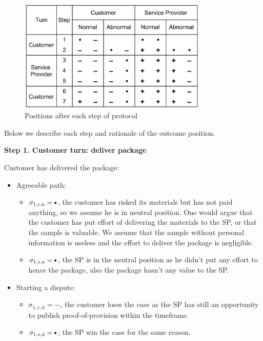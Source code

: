 \documentclass{ieeeaccess}
\newcommand\sbullet[1][.75]{\mathbin{\ThisStyle{\vcenter{\hbox{%
  \scalebox{#1}{$\SavedStyle\bullet$}}}}}%
}
\begin{document}
\begin{figure}[h!]
\includegraphics[width=9cm]{formal-table-of-positions.png}
\centering
\caption{Positions after each step of protocol}
\label{fig:positions}
\end{figure}


Below we describe each step and rationale of the outcome position.


\noindent \textbf
{Step 1. Customer turn: deliver package}\label{step-1-deliver-package}

Customer has delivered the package:

\begin{itemize}
\item
  Agreeable path:

  \begin{itemize}
  
  \item
    \(\sigma_{1, c, \mathrm{n}} = \sbullet\), the customer has risked its
    materials but has not paid anything, so we assume he is in neutral
    position. One would argue that the customer has put effort of
    delivering the materials to the SP, or that the sample is valuable.
    We assume that the sample without personal information is useless
    and the effort to deliver the package is negligible.
  \item
    \(\sigma_{1, s, \mathrm{n}} = \sbullet\), the SP is in the neutral position as he didn't put any effort to hence the package, also the package hasn't any value to the SP.
  \end{itemize}
\item
  Starting a dispute:

  \begin{itemize}
  
  \item
    \(\sigma_{1, c, \mathrm{d}} = -\), the customer loses the case as the SP has still an opportunity to publish proof-of-provision within the timeframe.
  \item
    \(\sigma_{1, s, \mathrm{d}} = \sbullet\), the SP win the case for the same reason.
  \end{itemize}
\end{itemize}
\end{document}
